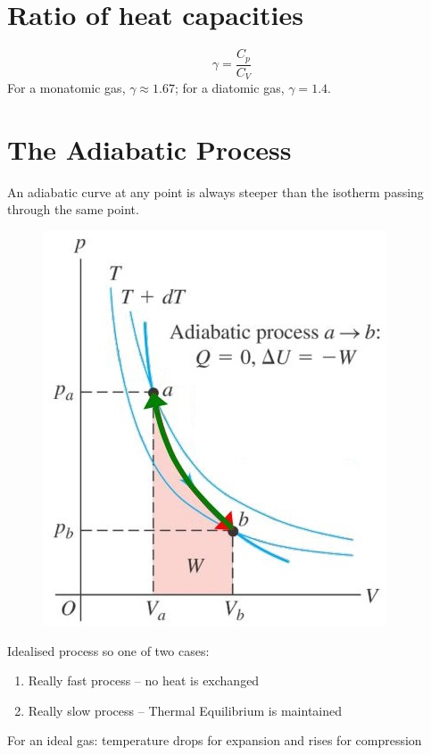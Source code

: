 \documentclass[a4paper, 11pt, normalem]{report}
\begin{document}
\section{Ratio of heat capacities}
\begin{equation}
	\gamma = \frac{C_{p}}{C_{V}}
\end{equation}
For a monatomic gas, $\gamma \approx 1.67$; for a diatomic gas, $\gamma = 1.4$.

\section{The Adiabatic Process}
An adiabatic curve at any point is always steeper than the isotherm passing through the same point.
\begin{figure}[H]
    \centering
    \includegraphics[scale=0.7]{Adiabatic.jpg}
\end{figure}
Idealised process so one of two cases:
\begin{enumerate}
	\item Really fast process -- no heat is exchanged
	\item Really slow process -- Thermal Equilibrium is maintained
\end{enumerate}
For an ideal gas: temperature drops for expansion and rises for compression
\end{document}
